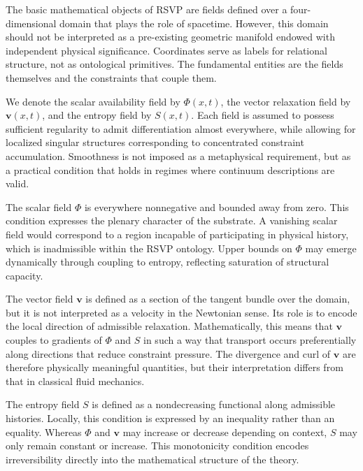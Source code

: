 \documentclass[11pt,oneside]{book}
\begin{document}
The basic mathematical objects of RSVP are fields defined over a four-dimensional domain that plays the role of spacetime. However, this domain should not be interpreted as a pre-existing geometric manifold endowed with independent physical significance. Coordinates serve as labels for relational structure, not as ontological primitives. The fundamental entities are the fields themselves and the constraints that couple them.

We denote the scalar availability field by $\Phi(x,t)$, the vector relaxation field by $\mathbf{v}(x,t)$, and the entropy field by $S(x,t)$. Each field is assumed to possess sufficient regularity to admit differentiation almost everywhere, while allowing for localized singular structures corresponding to concentrated constraint accumulation. Smoothness is not imposed as a metaphysical requirement, but as a practical condition that holds in regimes where continuum descriptions are valid.

The scalar field $\Phi$ is everywhere nonnegative and bounded away from zero. This condition expresses the plenary character of the substrate. A vanishing scalar field would correspond to a region incapable of participating in physical history, which is inadmissible within the RSVP ontology. Upper bounds on $\Phi$ may emerge dynamically through coupling to entropy, reflecting saturation of structural capacity.

The vector field $\mathbf{v}$ is defined as a section of the tangent bundle over the domain, but it is not interpreted as a velocity in the Newtonian sense. Its role is to encode the local direction of admissible relaxation. Mathematically, this means that $\mathbf{v}$ couples to gradients of $\Phi$ and $S$ in such a way that transport occurs preferentially along directions that reduce constraint pressure. The divergence and curl of $\mathbf{v}$ are therefore physically meaningful quantities, but their interpretation differs from that in classical fluid mechanics.

The entropy field $S$ is defined as a nondecreasing functional along admissible histories. Locally, this condition is expressed by an inequality rather than an equality. Whereas $\Phi$ and $\mathbf{v}$ may increase or decrease depending on context, $S$ may only remain constant or increase. This monotonicity condition encodes irreversibility directly into the mathematical structure of the theory.
\end{document}
